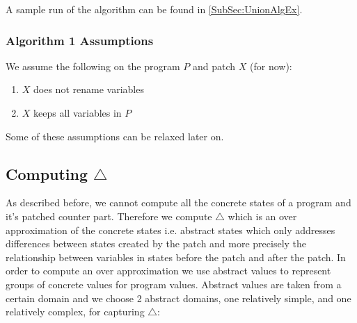 A sample run of the algorithm can be found in \ref{SubSec:UnionAlgEx}.

\subsubsection{Algorithm 1 Assumptions}
We assume the following on the program $P$ and patch $X$ (for now):
\begin{enumerate}
\item $X$ does not rename variables
\item $X$ keeps all variables in $P$
\end{enumerate}
Some of these assumptions can be relaxed later on.

\subsection{Computing $\triangle$} \label{SubSec:Delta}
As described before, we cannot compute all the concrete states of a program and it's patched counter part. Therefore we compute $\triangle$ which is an over approximation of the concrete states i.e. abstract states which only addresses differences between states created by the patch and more precisely the relationship between variables in states before the patch and after the patch.
In order to compute an over approximation we use abstract values to represent groups of concrete values for program values. Abstract values are taken from a certain domain and we choose 2 abstract domains, one relatively simple, and one relatively complex, for capturing $\triangle$:

